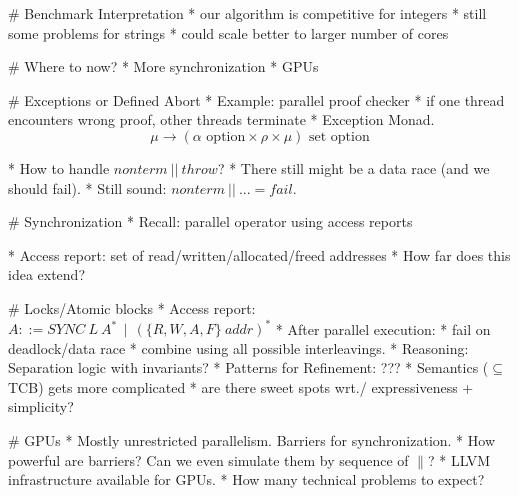 \documentclass[fleqn]{beamer}
\begin{document}
# Benchmark Interpretation
  * our algorithm is competitive for integers
  * still some problems for strings
  * could scale better to larger number of cores


# Where to now?
  * More synchronization
  * GPUs


# Exceptions or Defined Abort
  * Example: parallel proof checker
    * if one thread encounters wrong proof, other threads terminate
  * Exception Monad.
    \[ \mu \to (\alpha \textrm{ option}\times\rho\times\mu) \textrm{ set option}
    \]

  * How to handle $nonterm~||~throw$?
    * There still might be a data race (and we should fail).
    * Still sound: $nonterm~||~... = fail$.

# Synchronization
  * Recall: parallel operator using access reports


  * Access report: set of read/written/allocated/freed addresses
  * How far does this idea extend?


# Locks/Atomic blocks
  * Access report: $A ::= SYNC~L~A^*~~|~~(\{R,W,A,F\}~addr)^*$
  * After parallel execution:
    * fail on deadlock/data race
    * combine using all possible interleavings.
  * Reasoning: Separation logic with invariants?
  * Patterns for Refinement: ???
  * Semantics ($\subseteq$ TCB) gets more complicated
    * are there sweet spots wrt./ expressiveness + simplicity?


# GPUs
  * Mostly unrestricted parallelism. Barriers for synchronization.
  * How powerful are barriers? Can we even simulate them by sequence of $\parallel$?
  * LLVM infrastructure available for GPUs.
  * How many technical problems to expect?
\end{document}
